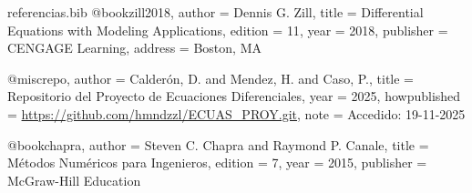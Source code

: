 \begin{filecontents*}{referencias.bib}
	@book{zill2018,
		author    = {Dennis G. Zill},
		title     = {Differential Equations with Modeling Applications},
		edition   = {11},
		year      = {2018},
		publisher = {CENGAGE Learning},
		address   = {Boston, MA}
	}
	
	@misc{repo,
		author       = {Calderón, D. and Mendez, H. and Caso, P.},
		title        = {Repositorio del Proyecto de Ecuaciones Diferenciales},
		year         = {2025},
		howpublished = {\url{https://github.com/hmndzzl/ECUAS_PROY.git}},
		note         = {Accedido: 19-11-2025}
	}
	
	@book{chapra,
		author    = {Steven C. Chapra and Raymond P. Canale},
		title     = {Métodos Numéricos para Ingenieros},
		edition   = {7},
		year      = {2015},
		publisher = {McGraw-Hill Education}
	}
\end{filecontents*}

\documentclass[12pt, a4paper]{report}

\usepackage[utf8]{inputenc}
\usepackage[spanish, es-tabla]{babel} 
\usepackage{amsmath, amssymb, amsfonts} 
\usepackage{graphicx} 
\usepackage{geometry} 
\usepackage{booktabs} 
\usepackage{float} 
\usepackage{hyperref} 
\usepackage{listings} 
\usepackage{xcolor} 
\usepackage{caption}
\usepackage{subcaption}
\usepackage{pdfpages} 
\usepackage{csquotes}
\usepackage[style=apa, backend=biber]{biblatex}

\graphicspath{{figs/}} 


\geometry{left=2.54cm, right=2.54cm, top=2.54cm, bottom=2.54cm}


\lstset{style=mystyle}

